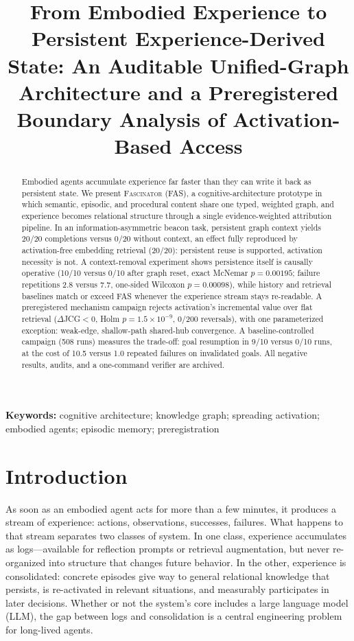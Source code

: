 \documentclass[10pt]{article}
\title{\bfseries From Embodied Experience to Persistent Experience-Derived State: An Auditable Unified-Graph Architecture and a Preregistered Boundary Analysis of Activation-Based Access}
\author{}
\date{}
\begin{document}
\maketitle
\begin{abstract}
Embodied agents accumulate experience far faster than they can write it back as persistent state. We present \textsc{Fascinator} (FAS), a cognitive-architecture prototype in which semantic, episodic, and procedural content share one typed, weighted graph, and experience becomes relational structure through a single evidence-weighted attribution pipeline. In an information-asymmetric beacon task, persistent graph context yields 20/20 completions versus 0/20 without context, an effect fully reproduced by activation-free embedding retrieval (20/20): persistent reuse is supported, activation necessity is not. A context-removal experiment shows persistence itself is causally operative (10/10 versus 0/10 after graph reset, exact McNemar $p{=}0.00195$; failure repetitions 2.8 versus 7.7, one-sided Wilcoxon $p{=}0.00098$), while history and retrieval baselines match or exceed FAS whenever the experience stream stays re-readable. A preregistered mechanism campaign rejects activation's incremental value over flat retrieval ($\Delta$JCG${<}0$, Holm $p{=}1.5\times10^{-9}$, 0/200 reversals), with one parameterized exception: weak-edge, shallow-path shared-hub convergence. A baseline-controlled campaign (508 runs) measures the trade-off: goal resumption in 9/10 versus 0/10 runs, at the cost of 10.5 versus 1.0 repeated failures on invalidated goals. All negative results, audits, and a one-command verifier are archived.
\end{abstract}
\vspace{6pt}
\noindent\textbf{Keywords:} cognitive architecture; knowledge graph; spreading activation; embodied agents; episodic memory; preregistration




\section{Introduction}
\label{sec:intro}

As soon as an embodied agent acts for more than a few minutes, it produces a stream of experience: actions, observations, successes, failures. What happens to that stream separates two classes of system. In one class, experience accumulates as logs---available for reflection prompts or retrieval augmentation, but never re-organized into structure that changes future behavior. In the other, experience is consolidated: concrete episodes give way to general relational knowledge that persists, is re-activated in relevant situations, and measurably participates in later decisions. Whether or not the system's core includes a large language model (LLM), the gap between logs and consolidation is a central engineering problem for long-lived agents.
\end{document}
